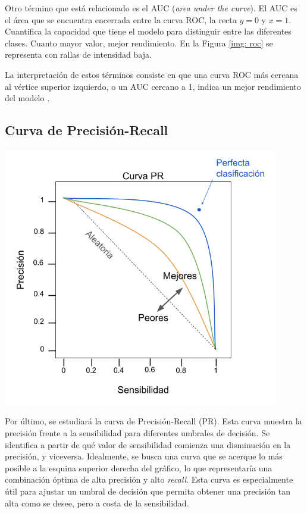Otro término que está relacionado es el AUC (\textit{area under the curve}). El AUC es el área que se encuentra encerrada entre la curva ROC, la recta $y = 0$ y $x = 1$. Cuantifica la capacidad que tiene el modelo para distinguir entre las diferentes clases. Cuanto mayor valor, mejor rendimiento. En la Figura \ref{img: roc} se representa con rallas de intensidad baja. 

La interpretación de estos términos consiste en que una curva ROC más cercana al vértice superior izquierdo, o un AUC cercano a 1, indica un mejor rendimiento del modelo \citep{geron2022hands}.

\subsection{Curva de Precisión-Recall}

\begin{minipage}{0.35\textwidth}
	\includegraphics[width=0.9\textwidth]{img/pr.png}
	\label{img: pr}
\end{minipage}
\begin{minipage}{0.05\textwidth}
\textbf{ }
\end{minipage}
\begin{minipage}{0.55\textwidth}
Por último, se estudiará la curva de Precisión-Recall (PR). Esta curva muestra la precisión frente a la sensibilidad para diferentes umbrales de decisión. Se identifica a partir de qué valor de sensibilidad comienza una disminución en la precisión, y viceversa. Idealmente, se busca una curva que se acerque lo más posible a la esquina superior derecha del gráfico, lo que representaría una combinación óptima de alta precisión y alto \textit{recall}. Esta curva es especialmente útil para ajustar un umbral de decisión que permita obtener una precisión tan alta como se desee, pero a costa de la sensibilidad. 
\end{minipage}

